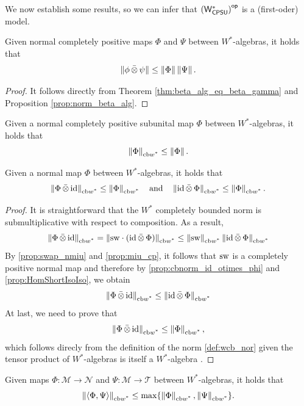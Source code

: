 We now establish some results, so we can infer that $\left(\mathsf{W^*_{CPSU}}\right)^{\mathsf{op}}$ is a (first-oder) model.

\begin{proposition} \label{prop:cb_tensor_mult}
  Given normal completely positive maps  $\Phi$ and $\Psi$ between $W^*$-algebras, it holds that
  \[
  \left\lVert \phi \,\bar{\otimes} \, \psi \right\rVert \leq \left\lVert \Phi \right\rVert \left\lVert \Psi \right\rVert.
\]
\end{proposition}

\begin{proof}
It follows directly from Theorem \ref{thm:beta_alg_eq_beta_gamma} and Proposition
\ref{prop:norm_beta_alg}.
\end{proof}

\begin{corollary} \label{cor:cbnorm_tensor_leq_norm}
   Given a normal completely positive subunital map  $\Phi$ between $W^*$-algebras, it holds that
   \[
  \left\lVert \Phi \right\rVert_{\text{cb$w^*$}} \leq \left\lVert \Phi \right\rVert.
\]
\end{corollary}

\begin{proposition} \label{prop:cbnorm_id_otimes_phi}
   Given a normal map $\Phi$ between $W^*$-algebras, it holds that
  \[
  \left\lVert \Phi \,\bar{\otimes} \, \mathrm{id} \right\rVert_{\text{cb$w^*$}} \leq \left\lVert \Phi \right\rVert_{\text{cb$w^*$}} \quad \text{and} \quad  \left\lVert \mathrm{id}\,\bar{\otimes} \, \Phi \right\rVert_{\text{cb$w^*$}} \leq \left\lVert \Phi \right\rVert_{\text{cb$w^*$}} .
\]
\end{proposition}

\begin{proof}
  It is straightforward that the $W^*$ completely bounded norm is submultiplicative with respect to composition. As a result, 
  \[
  \left\lVert \Phi \,\bar{\otimes} \, \mathrm{id} \right\rVert_{\text{cb$w^*$}} = \left\lVert \mathrm{sw} \cdot (\mathrm{id} \,\bar{\otimes} \,\Phi) \right\rVert_{\text{cb$w^*$}} \leq \left\lVert \mathrm{sw} \right\rVert_{\text{cb$w^*$}} \left\lVert \mathrm{id} \,\bar{\otimes} \,\Phi \right\rVert_{\text{cb$w^*$}}
  \]
By \autoref{prop:swap_nmiu} and \autoref{prop:miu_cp}, it follows that $\mathrm{sw}$ is a completely positive normal map and therefore by \autoref{prop:cbnorm_id_otimes_phi} and \autoref{prop:HomShortIsoIso}, we obtain
\[
  \left\lVert \Phi \,\bar{\otimes} \, \mathrm{id} \right\rVert_{\text{cb$w^*$}}  \leq \left\lVert \mathrm{id} \,\bar{\otimes} \,\Phi \right\rVert_{\text{cb$w^*$}}
\]
At last, we need to prove that
\[
  \left\lVert \Phi \,\bar{\otimes} \, \mathrm{id} \right\rVert_{\text{cb$w^*$}} \leq \left\lVert \Phi \right\rVert_{\text{cb$w^*$}},
\]  
which follows direcly from the definition of the norm \autoref{def:wcb_nor} given the tensor product of $W^*$-algebras is itself a $W^*$-algebra \cite[Definition 5.1]{takesakiTheoryOperatorAlgebras1979}.
\end{proof}

\begin{proposition} \label{prop:product_cb}
    Given  maps  $\Phi: \mathscr{M} \to \mathscr{N}$ and $\Psi: \mathscr{M} \to \mathscr{T}$ between $W^*$-algebras, it holds that
  \[
  \left\lVert \langle \Phi, \Psi \rangle \right\rVert_{\text{cb$w^*$}} \leq \max \{\left\lVert \Phi \right\rVert_{\text{cb$w^*$}}, \left\lVert \Psi \right\rVert_{\text{cb$w^*$}}\}.
\]
\end{proposition}

